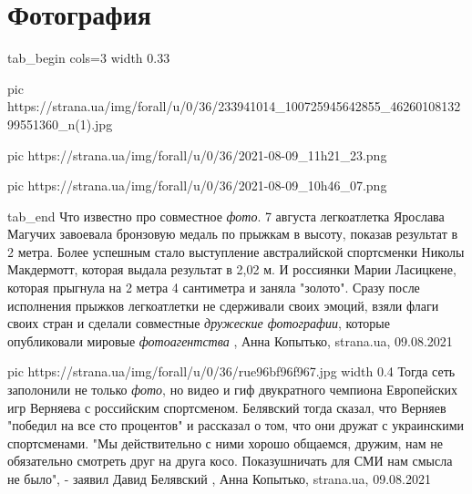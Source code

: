  
 
 
 
 
\chapter{Фотография}

\ifcmt
  tab_begin cols=3
		width 0.33

     pic https://strana.ua/img/forall/u/0/36/233941014_100725945642855_4626010813299551360_n(1).jpg

     pic https://strana.ua/img/forall/u/0/36/2021-08-09_11h21_23.png

		 pic https://strana.ua/img/forall/u/0/36/2021-08-09_10h46_07.png

  tab_end
\fi
Что известно про совместное \emph{фото}.  7 августа легкоатлетка Ярослава
Магучих завоевала бронзовую медаль по прыжкам в высоту, показав результат в 2
метра.  Более успешным стало выступление австралийской спортсменки Николы
Макдермотт, которая выдала результат в 2,02 м. И россиянки Марии Ласицкене,
которая прыгнула на 2 метра 4 сантиметра и заняла "золото".  Сразу после
исполнения прыжков легкоатлетки не сдерживали своих эмоций, взяли флаги своих
стран и сделали совместные \emph{дружеские фотографии}, которые опубликовали
мировые \emph{фотоагентства}
, 
Анна Копытько, strana.ua, 09.08.2021

\ifcmt
  pic https://strana.ua/img/forall/u/0/36/rue96bf96f967.jpg
  width 0.4
\fi
Тогда сеть заполонили не только \emph{фото}, но видео и гиф двукратного чемпиона
Европейских игр Верняева с российским спортсменом.
Белявский тогда сказал, что Верняев "победил на все сто процентов" и рассказал
о том, что они дружат с украинскими спортсменами. "Мы действительно с ними
хорошо общаемся, дружим, нам не обязательно смотреть друг на друга косо.
Показушничать для СМИ нам смысла не было", - заявил Давид Белявский
, 
Анна Копытько, strana.ua, 09.08.2021

